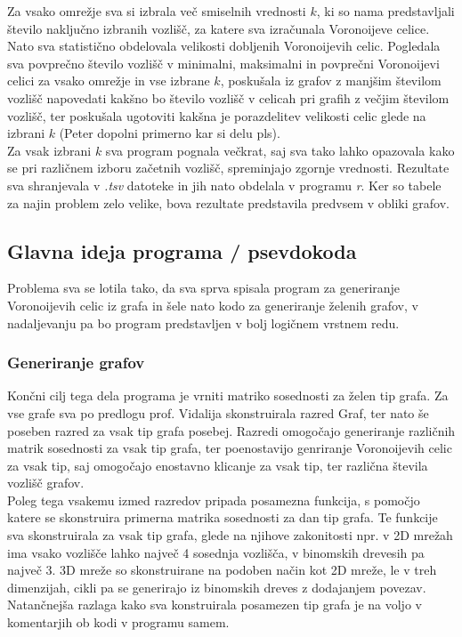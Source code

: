 \documentclass[
]{article}
\begin{document}
Za vsako omrežje sva si izbrala več smiselnih vrednosti \(k\), ki so
nama predstavljali število naključno izbranih vozlišč, za katere sva
izračunala Voronoijeve celice. Nato sva statistično obdelovala velikosti
dobljenih Voronoijevih celic. Pogledala sva povprečno število vozlišč v
minimalni, maksimalni in povprečni Voronoijevi celici za vsako omrežje
in vse izbrane \(k\), poskušala iz grafov z manjšim številom vozlišč
napovedati kakšno bo število vozlišč v celicah pri grafih z večjim
številom vozlišč, ter poskušala ugotoviti kakšna je porazdelitev
velikosti celic glede na izbrani \(k\) (Peter dopolni primerno kar si
delu pls).\\
Za vsak izbrani \(k\) sva program pognala večkrat, saj sva tako lahko
opazovala kako se pri različnem izboru začetnih vozlišč, spreminjajo
zgornje vrednosti. Rezultate sva shranjevala v \emph{.tsv} datoteke in
jih nato obdelala v programu \emph{r}. Ker so tabele za najin problem
zelo velike, bova rezultate predstavila predvsem v obliki grafov.

\hypertarget{glavna-ideja-programa-psevdokoda}{%
\subsection{Glavna ideja programa /
psevdokoda}\label{glavna-ideja-programa-psevdokoda}}

Problema sva se lotila tako, da sva sprva spisala program za generiranje
Voronoijevih celic iz grafa in šele nato kodo za generiranje želenih
grafov, v nadaljevanju pa bo program predstavljen v bolj logičnem
vrstnem redu.

\hypertarget{generiranje-grafov}{%
\subsubsection{Generiranje grafov}\label{generiranje-grafov}}

Končni cilj tega dela programa je vrniti matriko sosednosti za želen tip
grafa. Za vse grafe sva po predlogu prof. Vidalija skonstruirala razred
Graf, ter nato še poseben razred za vsak tip grafa posebej. Razredi
omogočajo generiranje različnih matrik sosednosti za vsak tip grafa, ter
poenostavijo genriranje Voronoijevih celic za vsak tip, saj omogočajo
enostavno klicanje za vsak tip, ter različna števila vozlišč grafov.\\
Poleg tega vsakemu izmed razredov pripada posamezna funkcija, s pomočjo
katere se skonstruira primerna matrika sosednosti za dan tip grafa. Te
funkcije sva skonstruirala za vsak tip grafa, glede na njihove
zakonitosti npr. v 2D mrežah ima vsako vozlišče lahko največ 4 sosednja
vozlišča, v binomskih drevesih pa največ 3. 3D mreže so skonstruirane na
podoben način kot 2D mreže, le v treh dimenzijah, cikli pa se generirajo
iz binomskih dreves z dodajanjem povezav. Natančnejša razlaga kako sva
konstruirala posamezen tip grafa je na voljo v komentarjih ob kodi v
programu samem.
\end{document}
